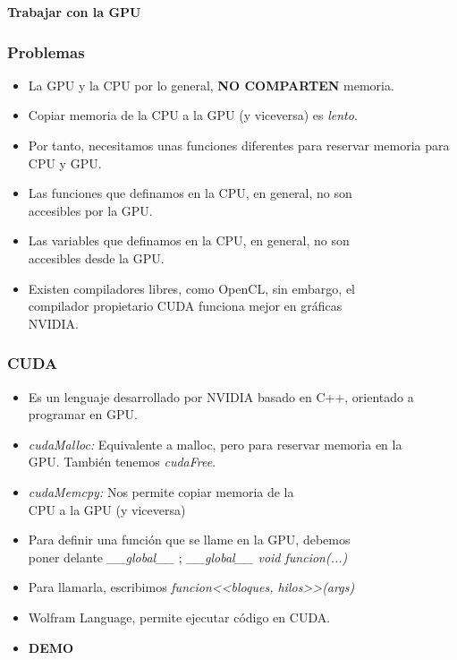 \documentclass[aspectratio=169]{beamer}
\begin{document}
\begin{frame}
	\centering \LARGE \bfseries \color{naranjaUCA} Trabajar con la GPU
\end{frame}

\begin{frame}
	\frametitle{Problemas}
	
	\begin{itemize}
		\item La GPU y la CPU por lo general, \textbf{NO COMPARTEN} memoria. \pause
		\item Copiar memoria de la CPU a la GPU (y viceversa) es \textit{lento}.\pause
		\item Por tanto, necesitamos unas funciones diferentes para reservar memoria para CPU y GPU. \pause
		\item Las funciones que definamos en la CPU, en general, no son\\ accesibles por la GPU. \pause
		\item Las variables que definamos en la CPU, en general, no son \\accesibles desde la GPU. \pause
		\item Existen compiladores libres, como OpenCL, sin embargo, el \\compilador propietario CUDA funciona mejor en gráficas\\ NVIDIA.
	\end{itemize}
\end{frame}

\begin{frame}
	\frametitle{CUDA}
	
	\begin{itemize}
		\item Es un lenguaje desarrollado por NVIDIA basado en C++, orientado a programar en GPU. \pause
		\item \textit{cudaMalloc: } Equivalente a malloc, pero para reservar memoria en la \\GPU. También tenemos \textit{cudaFree}.\pause
		\item \textit{cudaMemcpy: } Nos permite copiar memoria de la \\CPU a la GPU (y viceversa) \pause
		\item Para definir una función que se llame en la GPU, debemos\\ poner delante \textit{\_\_global\_\_} ; \pause \textit{\_\_global\_\_ void funcion(...)} \pause
		\item Para llamarla, escribimos \textit{funcion<<bloques, hilos>>(args)} \pause
		\item Wolfram Language, permite ejecutar código en CUDA.\pause
		\item \textbf{DEMO}
	\end{itemize}
\end{frame}
\end{document}
